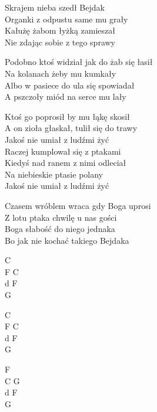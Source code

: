 \begin{text}
    Skrajem nieba szedł Bejdak\\
    Organki z odpustu same mu grały\\
    Kałużę żabom łyżką zamieszał\\
    Nie zdając sobie z tego sprawy

    Podobno ktoś widział jak do żab się łasił\\
    Na kolanach żeby mu kumkały\\
    Albo w pasiece do ula się spowiadał\\
    A pszczoły miód na serce mu lały

    Ktoś go poprosił by mu łąkę skosił\\
    A on zioła głaskał, tulił się do trawy\\
    Jakoś nie umiał z ludźmi żyć\\
    Raczej kumplował się z ptakami\\
    Kiedyś nad ranem z nimi odleciał\\
    Na niebieskie ptasie polany\\
    Jakoś nie umiał z ludźmi żyć

    Czasem wróblem wraca gdy Boga uprosi\\
    Z lotu ptaka chwilę u nas gości\\
    Boga słabość do niego jednaka\\
    Bo jak nie kochać takiego Bejdaka
\end{text}
\begin{chord}
    C\\
    F C\\
    d F\\
    G

    C\\
    F C\\
    d F\\
    G

    F\\
    C G\\
    d F\\
    G
\end{chord}